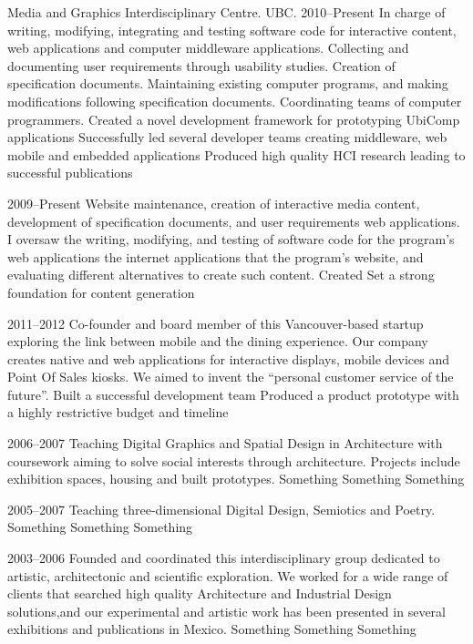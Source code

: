 \documentclass[full]{rvca}
\begin{document}
\workitem
{Media and Graphics Interdisciplinary Centre. UBC.}%
{2010--Present}%
{In charge of writing, modifying, integrating and testing software code for interactive content, web applications and computer middleware applications. Collecting and documenting user requirements through usability studies. Creation of specification documents. Maintaining existing computer programs, and making modifications following specification documents. Coordinating teams of computer programmers.}%
{Created a novel development framework for prototyping UbiComp applications}%
{Successfully led several developer teams creating middleware, web mobile and embedded applications}%
{Produced high quality HCI research leading to successful publications}%

{2009--Present}
{Website maintenance, creation of interactive media content, development of specification documents, and user requirements web applications. I oversaw the writing, modifying, and testing of software code for the program's web applications the internet applications that the program's website, and evaluating different alternatives to create such content.}
{Created }
{}
{Set a strong foundation for content generation}

{2011--2012}
{Co-founder and board member of this Vancouver-based startup exploring the link between mobile and the dining experience. Our company creates native and web applications for interactive displays, mobile devices and Point Of Sales kiosks. We aimed to invent the ``personal customer service of the future''.}
{}
{Built a successful development team}
{Produced a product prototype with a highly restrictive budget and timeline}

{2006--2007}
{Teaching Digital Graphics and Spatial Design in Architecture with coursework aiming to solve social interests through architecture. Projects include exhibition spaces, housing and built prototypes.}
{Something}
{Something}
{Something}

{2005--2007}
{Teaching three-dimensional Digital Design, Semiotics and Poetry.}
{Something}
{Something}
{Something}

{2003--2006}
{Founded and coordinated this interdisciplinary group dedicated to artistic, architectonic and scientific exploration. We worked for a wide range of clients that searched high quality Architecture and Industrial Design solutions,and our experimental and artistic work has been presented in several exhibitions and publications in Mexico.}
{Something}
{Something}
{Something}
\end{document}
